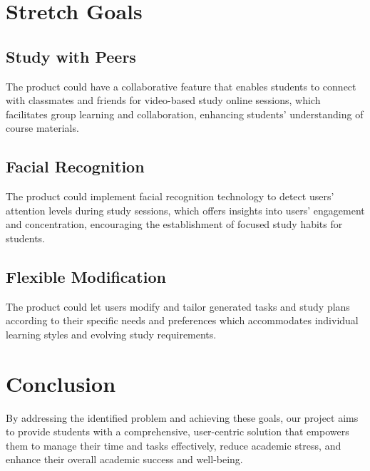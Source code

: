 \documentclass{article}
\begin{document}
\section{Stretch Goals}

    \subsection{Study with Peers}

    The product could have a collaborative feature that enables students to connect with classmates and friends for video-based study online sessions, which facilitates group learning and collaboration, enhancing students' understanding of course materials.        
    
    
    \subsection{Facial Recognition}
     The product could implement facial recognition technology to detect users' attention levels during study sessions, which offers insights into users' engagement and concentration, encouraging the establishment of focused study habits for students.

    \subsection{Flexible Modification}
    The product could let users modify and tailor generated tasks and study plans according to their specific needs and preferences which accommodates individual learning styles and evolving study requirements.
\section{Conclusion}

    By addressing the identified problem and achieving these goals, our project aims to provide students with a comprehensive, user-centric solution that empowers them to manage their time and tasks effectively, reduce academic stress, and enhance their overall academic success and well-being.
\end{document}
